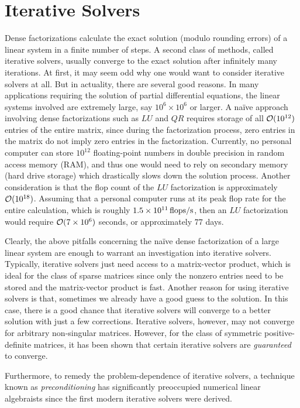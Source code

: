 \section{Iterative Solvers}

Dense factorizations calculate the exact solution (modulo rounding errors) of a linear system in a finite number of steps. A second class of methods, called iterative solvers, usually converge to the exact solution after infinitely many iterations. At first, it may seem odd why one would want to consider iterative solvers at all. But in actuality, there are several good reasons. In many applications requiring the solution of partial differential equations, the linear systems involved are extremely large, say $10^6\times10^6$ or larger. A na\"ive approach involving dense factorizations such as $LU$ and $QR$ requires storage of all $\mathcal{O}(10^{12})$ entries of the entire matrix, since during the factorization process, zero entries in the matrix do not imply zero entries in the factorization. Currently, no personal computer can store $10^{12}$ floating-point numbers in double precision in random access memory (RAM), and thus one would need to rely on secondary memory (hard drive storage) which drastically slows down the solution process. Another consideration is that the flop count of the $LU$ factorization is approximately $\mathcal{O}(10^{18})$. Assuming that a personal computer runs at its peak flop rate for the entire calculation, which is roughly $1.5\times10^{11}{\rm\,flops/s}$, then an $LU$ factorization would require $\mathcal{O}(7\times 10^6)$ seconds, or approximately $77$ days.

Clearly, the above pitfalls concerning the na\"ive dense factorization of a large linear system are enough to warrant an investigation into iterative solvers. Typically, iterative solvers just need access to a matrix-vector product, which is ideal for the class of sparse matrices since only the nonzero entries need to be stored and the matrix-vector product is fast. Another reason for using iterative solvers is that, sometimes we already have a good guess to the solution. In this case, there is a good chance that iterative solvers will converge to a better solution with just a few corrections. Iterative solvers, however, may not converge for arbitrary non-singular matrices. However, for the class of symmetric positive-definite matrices, it has been shown that certain iterative solvers are {\em guaranteed} to converge.

Furthermore, to remedy the problem-dependence of iterative solvers, a technique known as {\em preconditioning} has significantly preoccupied numerical linear algebraists since the first modern iterative solvers were derived.


